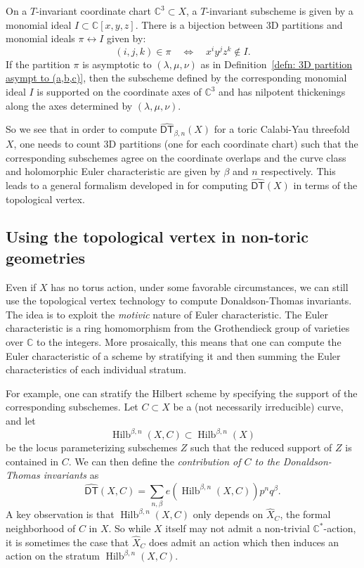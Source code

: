 \documentclass[12pt]{amsart}
\newcommand{\cnums} {{\mathbb C}}          %
\theoremstyle{definition}
\newcommand{\DThat}{\operatorname{\widehat{\mathsf{DT}}}}
\newcommand{\HilbBetan}{\operatorname{Hilb}^{\beta ,n}}
\newcommand{\Xhat}{\widehat{X}}
\begin{document}
On a $T$-invariant coordinate chart $\cnums^{3}\subset X$, a
$T$-invariant subscheme is given by a monomial ideal $I\subset \cnums
[x,y,z]$. There is a bijection between 3D partitions and monomial
ideals $\pi \leftrightarrow I$ given by:
\[
(i,j,k)\in \pi \quad \Longleftrightarrow \quad x^{i}y^{j}z^{k} \not \in  I.
\]
If the partition $\pi$ is asymptotic to $(\lambda, \mu, \nu )$ as in
Definition~\ref{defn: 3D partition asympt to (a,b,c)}, then the
subscheme defined by the corresponding monomial ideal $I$ is supported
on the coordinate axes of $\cnums^{3}$ and has nilpotent thickenings
along the axes determined by $(\lambda, \mu, \nu )$.

So we see that in order to compute $\DThat_{\beta ,n}(X)$ for a toric
Calabi-Yau threefold $X$, one needs to count 3D partitions (one for
each coordinate chart) such that the corresponding subschemes agree on
the coordinate overlaps and the curve class and holomorphic Euler
characteristic are given by $\beta $ and $n$ respectively. This leads
to a general formalism developed in \cite{MNOP1} for computing $\DThat
(X)$ in terms of the topological vertex.

\subsection{Using the topological vertex in non-toric geometries}

Even if $X$ has no torus action, under some favorable circumstances,
we can still use the topological vertex technology to compute
Donaldson-Thomas invariants. The idea is to exploit the \emph{motivic}
nature of Euler characteristic. The Euler characteristic is a ring
homomorphism from the Grothendieck group of varieties over $\cnums$ to
the integers. More prosaically, this means that one can compute the
Euler characteristic of a scheme by stratifying it and then summing
the Euler characteristics of each individual stratum.

For example, one can stratify the Hilbert scheme by specifying the support of the
corresponding subschemes. Let $C\subset X$ be a (not necessarily
irreducible) curve, and let
\[
\HilbBetan (X,C) \subset \HilbBetan (X)
\]
be the locus parameterizing subschemes $Z$ such that the reduced
support of $Z$ is contained in $C$. We can then define the
\emph{contribution of $C$ to the Donaldson-Thomas invariants} as
\[
\DThat (X,C) = \sum_{n,\beta} e(\HilbBetan (X,C))p^{n}q^{\beta}.
\]
A key observation is that $\HilbBetan (X,C)$ only depends on
$\Xhat_{C}$, the formal neighborhood of $C$ in $X$. So while $X$
itself may not admit a non-trivial $\cnums^{*}$-action, it is
sometimes the case that $\Xhat_{C}$ does admit an action which then
induces an action on the stratum $\HilbBetan (X,C)$.
\end{document}
